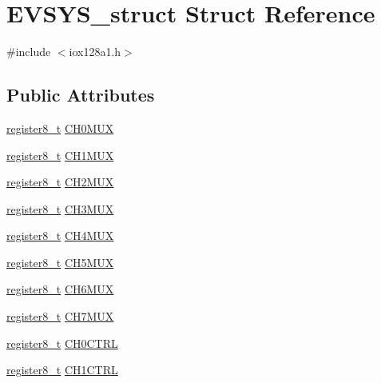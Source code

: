 \hypertarget{struct_e_v_s_y_s__struct}{
\section{EVSYS\_\-struct Struct Reference}
\label{struct_e_v_s_y_s__struct}
}


{\ttfamily \#include $<$iox128a1.h$>$}

\subsection*{Public Attributes}
\begin{DoxyCompactItemize}
\item 
\hyperlink{iox128a1_8h_a6a0649252b392263406882923b04a9db}{register8\_\-t} \hyperlink{struct_e_v_s_y_s__struct_a6e32eebe659f4ccfdb2691cac4d035db}{CH0MUX}
\item 
\hyperlink{iox128a1_8h_a6a0649252b392263406882923b04a9db}{register8\_\-t} \hyperlink{struct_e_v_s_y_s__struct_a839d5a508a07c077506b9ec5571542b1}{CH1MUX}
\item 
\hyperlink{iox128a1_8h_a6a0649252b392263406882923b04a9db}{register8\_\-t} \hyperlink{struct_e_v_s_y_s__struct_a21be25ecf59502d103b0db7485425020}{CH2MUX}
\item 
\hyperlink{iox128a1_8h_a6a0649252b392263406882923b04a9db}{register8\_\-t} \hyperlink{struct_e_v_s_y_s__struct_ab7220aa439f0fe0b4a3e57fd2d0d8c52}{CH3MUX}
\item 
\hyperlink{iox128a1_8h_a6a0649252b392263406882923b04a9db}{register8\_\-t} \hyperlink{struct_e_v_s_y_s__struct_ae82c118d87c46ad16666e966adbe840c}{CH4MUX}
\item 
\hyperlink{iox128a1_8h_a6a0649252b392263406882923b04a9db}{register8\_\-t} \hyperlink{struct_e_v_s_y_s__struct_a9dff4895d04141740c4001f3d53713f7}{CH5MUX}
\item 
\hyperlink{iox128a1_8h_a6a0649252b392263406882923b04a9db}{register8\_\-t} \hyperlink{struct_e_v_s_y_s__struct_a612bf2914796036a52ef64f3d6d7e355}{CH6MUX}
\item 
\hyperlink{iox128a1_8h_a6a0649252b392263406882923b04a9db}{register8\_\-t} \hyperlink{struct_e_v_s_y_s__struct_ab4be597a375669e49b5c71dad4bacdb4}{CH7MUX}
\item 
\hyperlink{iox128a1_8h_a6a0649252b392263406882923b04a9db}{register8\_\-t} \hyperlink{struct_e_v_s_y_s__struct_a039473dcd1af123093bfcbfc988500fa}{CH0CTRL}
\item 
\hyperlink{iox128a1_8h_a6a0649252b392263406882923b04a9db}{register8\_\-t} \hyperlink{struct_e_v_s_y_s__struct_acfcd6e3239d534f4985e6af989bc0d5d}{CH1CTRL}

\end{DoxyCompactItemize}
